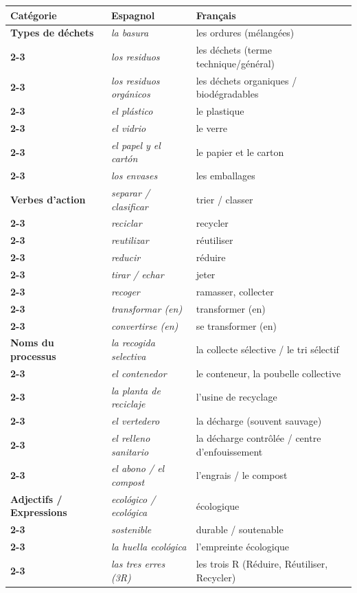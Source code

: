 \documentclass[11pt]{article}
\newcommand{\esp}[1]{\ifmmode\text{\textit{#1}}\else\begingroup\selectlanguage{spanish}\itshape #1\endgroup\fi}
\begin{document}
\begin{definition}
\begin{center}
\begin{tabularx}{\linewidth}{|>{\bfseries}X|X|X|}\hline
\rowcolor{popblueL} \textbf{Catégorie} & \textbf{Espagnol} & \textbf{Français} \\ \hline
\textbf{Types de déchets} & \esp{la basura} & les ordures (mélangées) \\ \cline{2-3}
& \esp{los residuos} & les déchets (terme technique/général) \\ \cline{2-3}
& \esp{los residuos orgánicos} & les déchets organiques / biodégradables \\ \cline{2-3}
& \esp{el plástico} & le plastique \\ \cline{2-3}
& \esp{el vidrio} & le verre \\ \cline{2-3}
& \esp{el papel y el cartón} & le papier et le carton \\ \cline{2-3}
& \esp{los envases} & les emballages \\ \hline
\textbf{Verbes d'action} & \esp{separar / clasificar} & trier / classer \\ \cline{2-3}
& \esp{reciclar} & recycler \\ \cline{2-3}
& \esp{reutilizar} & réutiliser \\ \cline{2-3}
& \esp{reducir} & réduire \\ \cline{2-3}
& \esp{tirar / echar} & jeter \\ \cline{2-3}
& \esp{recoger} & ramasser, collecter \\ \cline{2-3}
& \esp{transformar (en)} & transformer (en) \\ \cline{2-3}
& \esp{convertirse (en)} & se transformer (en) \\ \hline
\textbf{Noms du processus} & \esp{la recogida selectiva} & la collecte sélective / le tri sélectif \\ \cline{2-3}
& \esp{el contenedor} & le conteneur, la poubelle collective \\ \cline{2-3}
& \esp{la planta de reciclaje} & l'usine de recyclage \\ \cline{2-3}
& \esp{el vertedero} & la décharge (souvent sauvage) \\ \cline{2-3}
& \esp{el relleno sanitario} & la décharge contrôlée / centre d'enfouissement \\ \cline{2-3}
& \esp{el abono / el compost} & l'engrais / le compost \\ \hline
\textbf{Adjectifs / Expressions} & \esp{ecológico / ecológica} & écologique \\ \cline{2-3}
& \esp{sostenible} & durable / soutenable \\ \cline{2-3}
& \esp{la huella ecológica} & l'empreinte écologique \\ \cline{2-3}
& \esp{las tres erres (3R)} & les trois R (Réduire, Réutiliser, Recycler) \\ \hline
\end{tabularx}
\end{center}
\end{definition}
\end{document}
